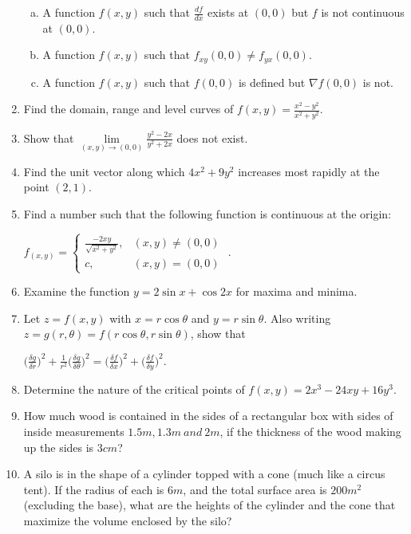 \documentclass[journal,12pt,twocolumn]{IEEEtran}
\begin{document}
\begin{enumerate}
\begin{enumerate}[(a)]
\item A function $f(x,y)$ such that $\frac{df}{dx}$ exists at $(0,0)$ but $f$ is not continuous at $(0,0)$.

\item  A function $f(x,y)$ such that $f_{xy}(0,0) \neq f_{yx}(0,0)$.

\item A function $f(x,y)$ such that $f(0,0)$ is defined but $\nabla f(0,0)$ is not.


\end{enumerate}

\item Find the domain, range and level curves of $f(x,y) = \frac{x^2-y^2}{x^2+y^2}$.


\item Show that $\lim\limits_{(x,y) \to (0,0)} \frac{y^2-2x}{y^2+2x}$ does not exist.

\item Find the unit vector along which $4x^2+9y^2$ increases most rapidly at the point $(2,1)$.

\item Find a number such that the following function is continuous at the origin:

$ 
f_(x,y)=\begin{cases}
\frac{-2xy}{\sqrt{x^2+y^2}},& (x,y) \neq (0,0) \\
c,& (x,y) = (0,0)
\end{cases}
$ .


\item Examine the function $y = 2 \sin x + \cos 2x$ for maxima and minima.

\item Let $z = f(x,y)$ with $x = r \cos \theta$ and $y = r \sin \theta$. Also writing $z = g(r,\theta) = f(r \cos \theta, r \sin \theta)$, show that

$\Big(\frac{\delta g}{\delta r}\Big)^2 + \frac{1}{r^2} \Big(\frac{\delta g}{\delta \theta}\Big)^2 = \Big(\frac{\delta f}{\delta x}\Big)^2 + \Big(\frac{\delta f}{\delta y}\Big)^2$.

\item Determine the nature of the critical points of $f(x,y) = 2x^3-24xy+16y^3$.

\item How much wood is contained in the sides of a rectangular box with sides of inside measurements
$1.5m, 1.3m \ and \ 2m$, if the thickness of the wood making up the sides is $3cm$?

\item A silo is in the shape of a cylinder topped with a cone (much like a circus tent). If the radius of
each is $6m$, and the total surface area is $200 m^2$ (excluding the base), what are the heights of the
cylinder and the cone that maximize the volume enclosed by the silo?


\end{enumerate}
\end{document}
